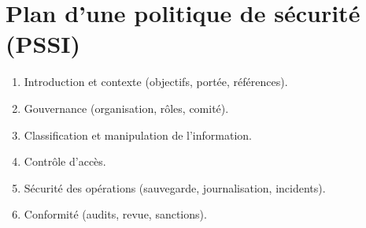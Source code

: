 \section*{Plan d'une politique de sécurité (PSSI)}
\begin{enumerate}
    \item Introduction et contexte (objectifs, portée, références).
    \item Gouvernance (organisation, rôles, comité).
    \item Classification et manipulation de l'information.
    \item Contrôle d'accès.
    \item Sécurité des opérations (sauvegarde, journalisation, incidents).
    \item Conformité (audits, revue, sanctions).
\end{enumerate}
